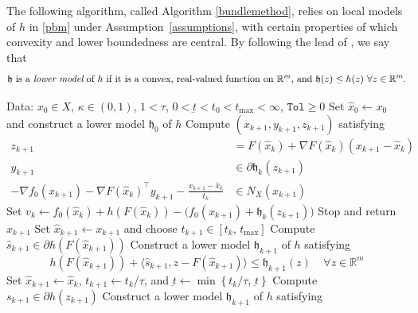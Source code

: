 \documentclass[smallextended,envcountsect]{svjour3}
\newcommand{\col}[1]{\left\{#1\right\}}
\newcommand{\tol}{\texttt{Tol}}
\newcommand{\inner}[2]{\langle#1,#2\rangle}
\newcommand{\modelh}{\mathfrak{h}}
\newcommand{\reals}{\mathbb{R}}
\begin{document}
The following algorithm, called Algorithm \ref{bundlemethod}, relies on local models of $h$ in \eqref{pbm} under Assumption~\ref{assumptions}, with certain properties of which convexity and lower boundedness are central. By following the lead of \cite{Oliveira_Sagastizabal_2014}, we say that 
\[
\text{$\modelh$ is a {\em lower model} of $h$ if it is a convex, real-valued function on $\reals^m$, and $\modelh(z) \leq h(z)~\forall z\in \reals^m$.}
\]




\begin{algorithm}[htb]
\caption{Composite Proximal Bundle Method}
\label{bundlemethod}
\begin{algorithmic}[1]
{\footnotesize
\State  Data: $x_0\in X$, $\kappa \in (0,1)$, $1<\tau $, $0<\underbar{t}<t_0<t_{\max}<\infty$, $\tol \geq 0$
\State Set $\hat x_0\gets x_0$ and construct a lower model $\modelh_0$ of $h$
\State Compute $(x_{k+1}, y_{k+1}, z_{k+1})$ satisfying \label{line:xkk}
\begin{subequations}\label{eqn:MP}
\begin{align}
z_{k+1} &= F(\hat x_k)+\nabla F(\hat x_k)(x_{k+1}-\hat x_k)\label{eqn:MP1}\\
y_{k+1} &\in \partial \modelh_k(z_{k+1})\label{eqn:MP2}\\
-\nabla f_0(x_{k+1}) - \nabla F(\hat x_k)^\top y_{k+1} - \frac{x_{k+1}-\hat x_k}{t_k} &\in N_X(x_{k+1})\label{eqn:MP3} 
\end{align}
\end{subequations}
\State Set $v_k\gets f_0(\hat x_k)+h(F(\hat x_k)) - \big(f_0(x_{k+1}) + \modelh_k(z_{k+1})\big)$ \label{line:vk}
\If{$v_k\leq \tol$}
\State Stop and return $x_{k+1}$ %
\EndIf
%
\label{call-oracle-c}
\label{call-oracle-hc}
\State Set $\hat x_{k+1} \gets x_{k+1}$ and choose $t_{k+1}\in [t_k, \,t_{\max}]$
\State Compute $\hat s_{k+1} \in \partial h(F(\hat x_{k+1}))$
\State Construct a lower model $\modelh_{k+1}$ of $h$ satisfying
\[
h(F(\hat x_{k+1}))+\inner{\hat s_{k+1}}{z-F(\hat x_{k+1})}
 \leq \modelh_{k+1}(z)~~~~~\forall z\in \reals^m
\]
\Else
\State Set $ \hat x_{k+1}\gets \hat x_k$, $t_{k+1}\gets t_k/\tau$, and $\underbar{t}\gets \min\col{t_{k}/\tau,\,\underbar{t}}$ \label{line:decrease_t} 
\State Compute $s_{k+1} \in \partial h(z_{k+1})$
\State Construct a lower model $\modelh_{k+1}$ of $h$ satisfying
}
\end{algorithmic}
\end{algorithm}
\end{document}
